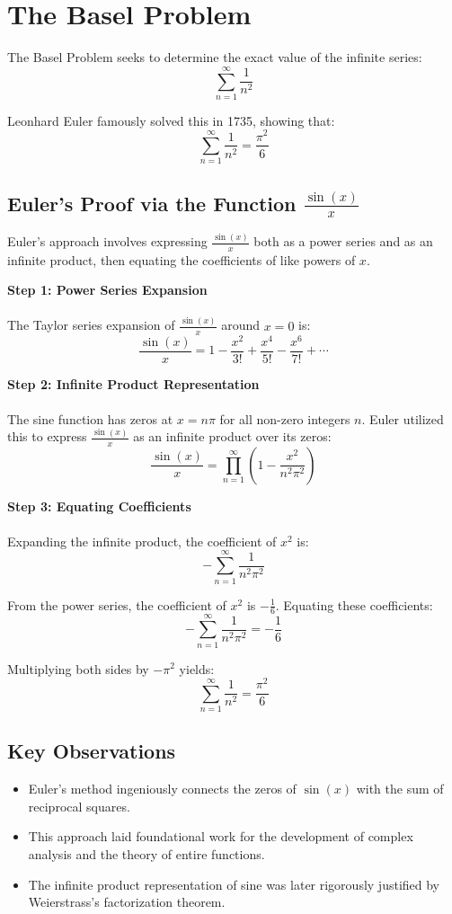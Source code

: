 \section{The Basel Problem}

The Basel Problem seeks to determine the exact value of the infinite series:
\[
\sum_{n=1}^{\infty} \frac{1}{n^2}
\]

Leonhard Euler famously solved this in 1735, showing that:
\[
\sum_{n=1}^{\infty} \frac{1}{n^2} = \frac{\pi^2}{6}
\]

\subsection{Euler's Proof via the Function \( \frac{\sin(x)}{x} \)}

Euler's approach involves expressing \( \frac{\sin(x)}{x} \) both as a power series and as an infinite product, then equating the coefficients of like powers of \( x \).

\textbf{Step 1: Power Series Expansion}
\\\\
The Taylor series expansion of \( \frac{\sin(x)}{x} \) around \( x = 0 \) is:
\[
\frac{\sin(x)}{x} = 1 - \frac{x^2}{3!} + \frac{x^4}{5!} - \frac{x^6}{7!} + \cdots
\]

\textbf{Step 2: Infinite Product Representation}
\\\\
The sine function has zeros at \( x = n\pi \) for all non-zero integers \( n \). Euler utilized this to express \( \frac{\sin(x)}{x} \) as an infinite product over its zeros:
\[
\frac{\sin(x)}{x} = \prod_{n=1}^{\infty} \left(1 - \frac{x^2}{n^2\pi^2}\right)
\]

\textbf{Step 3: Equating Coefficients}
\\\\
Expanding the infinite product, the coefficient of \( x^2 \) is:
\[
-\sum_{n=1}^{\infty} \frac{1}{n^2\pi^2}
\]

From the power series, the coefficient of \( x^2 \) is \( -\frac{1}{6} \). Equating these coefficients:
\[
-\sum_{n=1}^{\infty} \frac{1}{n^2\pi^2} = -\frac{1}{6}
\]

Multiplying both sides by \( -\pi^2 \) yields:
\[
\sum_{n=1}^{\infty} \frac{1}{n^2} = \frac{\pi^2}{6}
\]

\subsection{Key Observations}

\begin{itemize}[label=\(-\)]
    \item Euler's method ingeniously connects the zeros of \( \sin(x) \) with the sum of reciprocal squares.
    \item This approach laid foundational work for the development of complex analysis and the theory of entire functions.
    \item The infinite product representation of sine was later rigorously justified by Weierstrass's factorization theorem.
\end{itemize}
